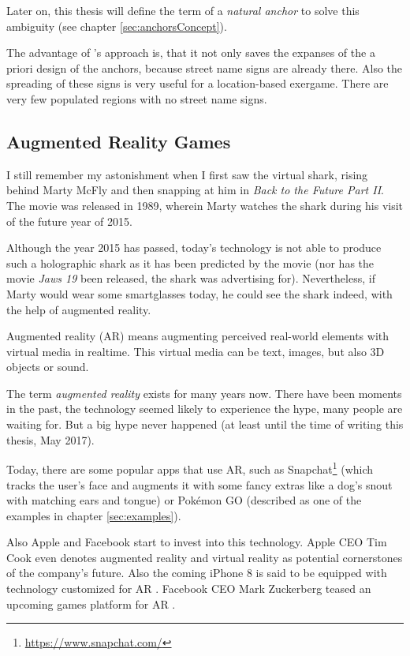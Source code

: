 Later on, this thesis will define the term of a \emph{natural anchor} to solve this ambiguity (see chapter \ref{sec:anchorsConcept}).

The advantage of \citeauthor{hock2014augmented}'s approach is, that it not only saves the expanses of the a priori design of the anchors, because street name signs are already there. Also the spreading of these signs is very useful for a location-based exergame. There are very few populated regions with no street name signs.

\subsection{Augmented Reality Games}\label{sec:augmentedRealityStateOfTheArt}
I still remember my astonishment when I first saw the virtual shark, rising behind Marty McFly and then snapping at him in \emph{Back to the Future Part II}. The movie was released in 1989, wherein Marty watches the shark during his visit of the future year of 2015.

Although the year 2015 has passed, today's technology is not able to produce such a holographic shark as it has been predicted by the movie (nor has the movie \emph{Jaws 19} been released, the shark was advertising for).
Nevertheless, if Marty would wear some smartglasses today, he could see the shark indeed, with the help of augmented reality.

Augmented reality (AR) means augmenting perceived real-world elements with virtual media in realtime. This virtual media can be text, images, but also 3D objects or sound.

The term \emph{augmented reality} exists for many years now. There have been moments in the past, the technology seemed likely to experience the hype, many people are waiting for. But a big hype never happened (at least until the time of writing this thesis, May 2017).

Today, there are some popular apps that use AR, such as Snapchat\footnote{\url{https://www.snapchat.com/}} (which tracks the user's face and augments it with some fancy extras like a dog's snout with matching ears and tongue) or Pok\'{e}mon GO (described as one of the examples in chapter \ref{sec:examples}).

Also Apple and Facebook start to invest into this technology. Apple CEO Tim Cook even denotes augmented reality and virtual reality as potential cornerstones of the company's future. Also the coming iPhone 8 is said to be equipped with technology customized for AR \citep{iPhone8AR}. Facebook CEO Mark Zuckerberg teased an upcoming games platform for AR \citep{facebookAR}.

